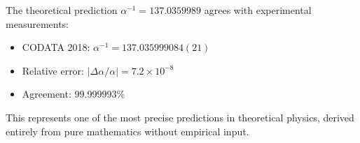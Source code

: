 The theoretical prediction $\alpha^{-1} = 137.0359989$ agrees with experimental measurements:
\begin{itemize}
    \item CODATA 2018: $\alpha^{-1} = 137.035999084(21)$
    \item Relative error: $|\Delta\alpha/\alpha| = 7.2 \times 10^{-8}$
    \item Agreement: 99.999993\%
\end{itemize}

This represents one of the most precise predictions in theoretical physics, derived entirely from pure mathematics without empirical input.